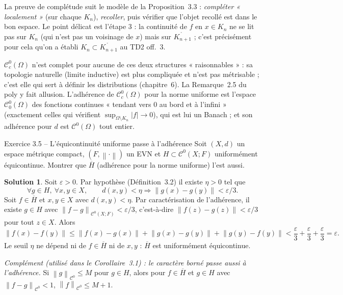 \documentclass[11pt,a4paper]{article}
\newcommand{\interieur}[1]{\mathring{#1}}
\newcommand{\adh}[1]{\overline{#1}}
\newcommand{\norm}[1]{\left\|#1\right\|}
\newcommand{\Cz}{\mathcal{C}^0}
\newcommand{\Cc}{\mathcal{C}^0_c}
\newcommand{\ie}{c'est-à-dire}
\theoremstyle{definition}
\newtheorem*{solution}{Solution}
\begin{document}
\begin{pointcle}
La preuve de complétude suit le modèle de la Proposition~3.3 : \emph{compléter « localement »} (sur chaque $K_n$), \emph{recoller}, puis vérifier que l'objet recollé est dans le bon espace. Le point délicat est l'étape 3 : la continuité de $f$ en $x\in K_n$ ne se lit pas sur $K_n$ (qui n'est pas un voisinage de $x$) mais sur $\interieur{K_{n+1}}$ ; c'est précisément pour cela qu'on a établi $K_n\subset\interieur{K_{n+1}}$ au TD2 off.~3.
\end{pointcle}

\begin{commentaire}
$\Cc(\Omega)$ n'est complet pour aucune de ces deux structures « raisonnables » : sa topologie naturelle (limite inductive) est plus compliquée et n'est pas métrisable ; c'est elle qui sert à définir les distributions (chapitre~6). La Remarque~2.5 du poly y fait allusion. L'adhérence de $\Cc(\Omega)$ pour la norme uniforme est l'espace $\Cz_0(\Omega)$ des fonctions continues « tendant vers $0$ au bord et à l'infini » (exactement celles qui vérifient $\sup_{\Omega\setminus K_n}|f|\to0$), qui est lui un Banach ; et son adhérence pour $d$ est $\Cz(\Omega)$ tout entier.
\end{commentaire}

\begin{exo}{Exercice 3.5 -- L'équicontinuité uniforme passe à l'adhérence}
Soit $(X,d)$ un espace métrique compact, $(F,\norm\cdot)$ un EVN et $H\subset\Cz(X;F)$ uniformément équicontinue. Montrer que $\adh H$ (adhérence pour la norme uniforme) l'est aussi.
\end{exo}

\begin{solution}
Soit $\varepsilon>0$. Par hypothèse (Définition~3.2) il existe $\eta>0$ tel que
\[
\forall g\in H,\ \forall x,y\in X,\qquad d(x,y)<\eta\Rightarrow\norm{g(x)-g(y)}<\varepsilon/3 .
\]
Soit $f\in\adh H$ et $x,y\in X$ avec $d(x,y)<\eta$. Par caractérisation de l'adhérence, il existe $g\in H$ avec $\norm{f-g}_{\Cz(X;F)}<\varepsilon/3$, \ie{} $\norm{f(z)-g(z)}<\varepsilon/3$ pour tout $z\in X$. Alors
\[
\norm{f(x)-f(y)}\le\norm{f(x)-g(x)}+\norm{g(x)-g(y)}+\norm{g(y)-f(y)}<\frac\varepsilon3+\frac\varepsilon3+\frac\varepsilon3=\varepsilon .
\]
Le seuil $\eta$ ne dépend ni de $f\in\adh H$ ni de $x,y$ : $\adh H$ est uniformément équicontinue.

\emph{Complément (utilisé dans le Corollaire~3.1) : le caractère borné passe aussi à l'adhérence.} Si $\norm g_{\Cz}\le M$ pour $g\in H$, alors pour $f\in\adh H$ et $g\in H$ avec $\norm{f-g}_{\Cz}<1$, $\norm f_{\Cz}\le M+1$.
\end{solution}
\end{document}
